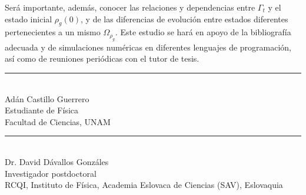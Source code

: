 \documentclass[onecolumn,11pt]{article}
\begin{document}
Será importante, además, conocer las relaciones y dependencias entre $\Gamma_{t}$ y el estado inicial $\rho_{g}(0)$, y de las diferencias de evolución entre estados diferentes pertenecientes a un mismo $\Omega_{\rho_{g}}$. Este estudio se hará en apoyo de la bibliografía adecuada y de simulaciones numéricas en diferentes lenguajes de programación, así como de reuniones periódicas con el tutor de tesis.

\vspace{3.0cm}


\begin{center}
    \rule{200pt}{0.4pt}\\
    Adán Castillo Guerrero \\
    Estudiante de Física \\
    Facultad de Ciencias, UNAM \\
    
\end{center}

\vspace{1.0cm}

\begin{center}
    \rule{200pt}{0.4pt}\\
    Dr. David Dávallos Gonzáles \\
    Investigador postdoctoral \\
    RCQI, Instituto de Física, Academia Eslovaca de Ciencias (SAV), Eslovaquia\\
    
\end{center}


\end{document}
